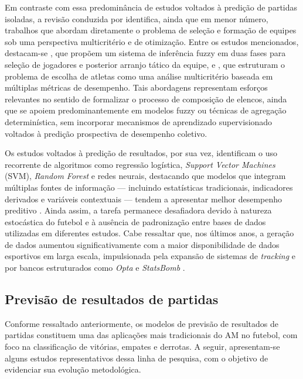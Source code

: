 Em contraste com essa predominância de estudos voltados à predição de partidas isoladas, a revisão conduzida por \cite{Abidin2021} identifica, ainda que em menor número, 
trabalhos que abordam diretamente o problema de seleção e formação de equipes sob uma perspectiva multicritério e de otimização. Entre os estudos mencionados, destacam-se 
\cite{Tavana2013}, que propõem um sistema de inferência fuzzy em duas fases para seleção de jogadores e posterior arranjo tático da equipe, e \cite{Qader2017}, que estruturam o 
problema de escolha de atletas como uma análise multicritério baseada em múltiplas métricas de desempenho. Tais abordagens representam esforços relevantes 
no sentido de formalizar o processo de composição de elencos, ainda que se apoiem predominantemente em modelos fuzzy ou técnicas de agregação determinística, 
sem incorporar mecanismos de aprendizado supervisionado voltados à predição prospectiva de desempenho coletivo.

Os estudos voltados à predição de resultados, por sua vez, identificam o uso recorrente de algoritmos como regressão logística, \textit{Support Vector Machines} (SVM), 
\textit{Random Forest} e redes neurais, destacando que modelos que integram múltiplas fontes de informação — incluindo estatísticas tradicionais, indicadores derivados 
e variáveis contextuais — tendem a apresentar melhor desempenho preditivo \cite{Horvat2020}. Ainda assim, a tarefa permanece desafiadora devido à natureza estocástica 
do futebol e à ausência de padronização entre bases de dados utilizadas em diferentes estudos. Cabe ressaltar que, nos últimos anos, a geração de dados aumentou 
significativamente com a maior disponibilidade de dados esportivos em larga escala, impulsionada pela expansão de sistemas de \textit{tracking} e por bancos estruturados 
como \textit{Opta} e \textit{StatsBomb} \cite{Horvat2020}.

\subsection{Previsão de resultados de partidas}

Conforme ressaltado anteriormente, os modelos de previsão de resultados de partidas constituem uma das aplicações mais tradicionais do AM no futebol, 
com foco na classificação de vitórias, empates e derrotas. A seguir, apresentam-se alguns estudos representativos dessa linha de pesquisa, com o objetivo 
de evidenciar sua evolução metodológica.

